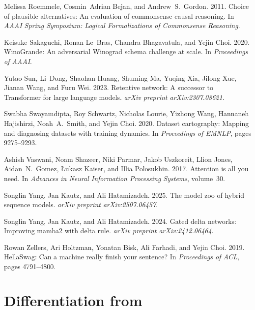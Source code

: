 \documentclass[11pt]{article}
\begin{document}
\begin{thebibliography}{}
Melissa Roemmele, Cosmin~Adrian Bejan, and Andrew~S.\ Gordon. 2011.
Choice of plausible alternatives: An evaluation of commonsense causal reasoning.
In \textit{AAAI Spring Symposium: Logical Formalizations of Commonsense Reasoning}.

Keisuke Sakaguchi, Ronan Le~Bras, Chandra Bhagavatula, and Yejin Choi. 2020.
WinoGrande: An adversarial Winograd schema challenge at scale.
In \textit{Proceedings of AAAI}.

Yutao Sun, Li~Dong, Shaohan Huang, Shuming Ma, Yuqing Xia, Jilong Xue, Jianan Wang, and Furu Wei. 2023.
Retentive network: A successor to Transformer for large language models.
\textit{arXiv preprint arXiv:2307.08621}.

Swabha Swayamdipta, Roy Schwartz, Nicholas Lourie, Yizhong Wang, Hannaneh Hajishirzi, Noah~A.\ Smith, and Yejin Choi. 2020.
Dataset cartography: Mapping and diagnosing datasets with training dynamics.
In \textit{Proceedings of EMNLP}, pages 9275--9293.

Ashish Vaswani, Noam Shazeer, Niki Parmar, Jakob Uszkoreit, Llion Jones, Aidan~N.\ Gomez, {\L}ukasz Kaiser, and Illia Polosukhin. 2017.
Attention is all you need.
In \textit{Advances in Neural Information Processing Systems}, volume~30.

Songlin Yang, Jan Kautz, and Ali Hatamizadeh. 2025.
The model zoo of hybrid sequence models.
\textit{arXiv preprint arXiv:2507.06457}.

Songlin Yang, Jan Kautz, and Ali Hatamizadeh. 2024.
Gated delta networks: Improving mamba2 with delta rule.
\textit{arXiv preprint arXiv:2412.06464}.

Rowan Zellers, Ari Holtzman, Yonatan Bisk, Ali Farhadi, and Yejin Choi. 2019.
HellaSwag: Can a machine really finish your sentence?
In \textit{Proceedings of ACL}, pages 4791--4800.

\end{thebibliography}

\appendix
\section{Differentiation from \citet{wang2025zoo}}
\label{app:wang}
\end{document}
